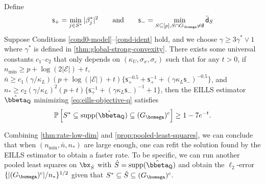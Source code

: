 \documentclass[10pt]{article}
\numberwithin{equation}{section}
\newcommand*{\supp}{\mathrm{supp}}
\begin{document}
\begin{theorem}
\label{thm:rate-low-dim} Define
\begin{align}
\label{eq:thm2-signal}
    \mathsf{s}_+ = \min_{j\in S^*} |\beta_j^*|^2 \qquad \text{and} \qquad \mathsf{s}_- = \min_{S\subseteq [p], S\cap G_{\bomega} \neq \emptyset} \bar{\mathsf{d}}_S
\end{align} 
Suppose Conditions \ref{cond0-model}--\ref{cond-ident} hold, and we choose $\gamma \ge 3\gamma^*\lor 1$ where $\gamma^*$ is defined in \cref{thm:global-strong-convexity}. There exists some universal constants $c_1$--$c_2$ that only depends on $(\kappa_U, \sigma_x, \sigma_\varepsilon)$ such that for any $t>0$, if $n_{\min} \ge p + \log(2|\mathcal{E}|) + t$, $\bar{n} \ge c_1(\gamma/\kappa_L)(p+ \log(|\mathcal{E}|) + t)\{\mathsf{s}_+^{-0.5}+\mathsf{s}_+^{-1}+(\gamma\kappa_L\mathsf{s}_-)^{-0.5}\}$, and $n_* \ge c_2(\gamma/\kappa_L)^2(p+t)\{\mathsf{s}_+^{-1} + (\gamma\kappa_L\mathsf{s}_-)^{-1} + 1\}$, then the EILLS estimator $\hat{\bbeta}_{\mathsf{Q}}$ minimizing \eqref{eq:eills-objective-q} satisfies
\begin{align}
\label{eq:low-dim-variable-selection}
    \mathbb{P}\left[S^* \subseteq \supp(\hat{\bbeta}_{\mathsf{Q}}) \subseteq (G_{\bomega})^c \right] \ge 1-7e^{-t}.
\end{align}
\end{theorem}

Combining \cref{thm:rate-low-dim} and \cref{prop:pooled-least-squares}, we can conclude that when $(n_{\min}, \bar{n}, n_*)$ are large enough, one can refit the solution found by the EILLS estimator to obtain a faster rate. To be specific, we can run another pooled least squares on $\bx_{\hat{S}}$ with $\hat{S}=\supp(\hat{\bbeta}_{\mathsf{Q}})$ and obtain the $\ell_2$-error $\{|(G_{\bomega})^c|/n_*\}^{1/2}$ given that $S^*\subseteq \hat{S}\subseteq (G_{\bomega})^c$. 
\end{document}
